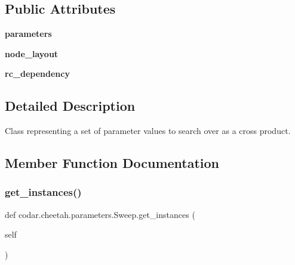 \subsection*{Public Attributes}
\begin{DoxyCompactItemize}
\item 
\mbox{\label{classcodar_1_1cheetah_1_1parameters_1_1_sweep_a5150062c13d48ec754188e4806958879}} 
{\bfseries parameters}
\item 
\mbox{\label{classcodar_1_1cheetah_1_1parameters_1_1_sweep_a2f9c8f2db28d801a5148904e85af06c6}} 
{\bfseries node\+\_\+layout}
\item 
\mbox{\label{classcodar_1_1cheetah_1_1parameters_1_1_sweep_acaa6e4b27adef89d6383a075d31e761c}} 
{\bfseries rc\+\_\+dependency}
\end{DoxyCompactItemize}


\subsection{Detailed Description}
\begin{DoxyVerb}Class representing a set of parameter values to search over as
a cross product.
\end{DoxyVerb}
 

\subsection{Member Function Documentation}
\mbox{\label{classcodar_1_1cheetah_1_1parameters_1_1_sweep_a25c111a2541f852d385d84baf51e9687}} 
\subsubsection{\texorpdfstring{get\+\_\+instances()}{get\_instances()}}
{\footnotesize\ttfamily def codar.\+cheetah.\+parameters.\+Sweep.\+get\+\_\+instances (\begin{DoxyParamCaption}\item[{}]{self }\end{DoxyParamCaption})}

